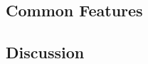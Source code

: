 \subsection{Common Features}
\label{common_feature}
\lorem

\subsection{Discussion}
\label{discussion_litreview}
\lorem



